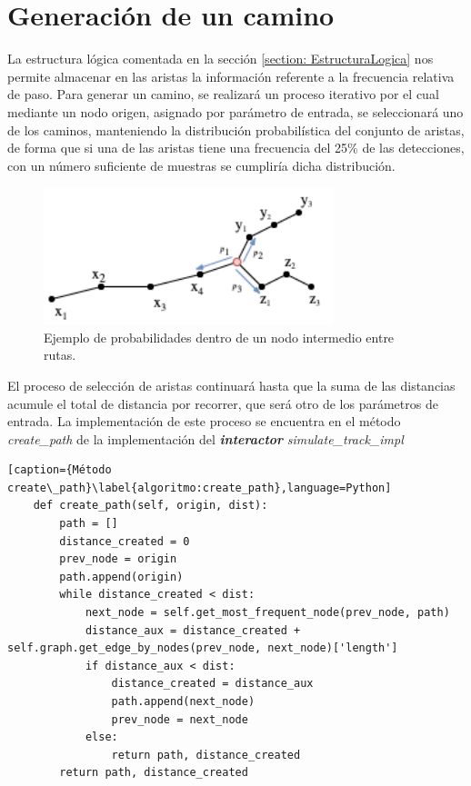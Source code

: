 \section{Generación de un camino}

La estructura lógica comentada en la sección \ref{section: EstructuraLogica} nos permite 
almacenar en las aristas la información referente a la frecuencia relativa de paso.
Para generar un camino, se realizará un proceso iterativo por el cual mediante un nodo origen, 
asignado por parámetro de entrada, se seleccionará uno de los caminos, manteniendo la 
distribución probabilística del conjunto de aristas, de forma que si una de las aristas tiene una 
frecuencia del 25\% de las detecciones, con un número suficiente de muestras se cumpliría dicha 
distribución. 
\begin{figure}[!htb]
\begin{center}
\includegraphics[width=0.75\textwidth]{./Imagenes/SimulationProbabilities.png}
\caption{Ejemplo de probabilidades dentro de un nodo intermedio entre rutas.}
\label{fig:PointGeneration02}
\end{center}
\end{figure}

El proceso de selección de aristas continuará hasta que la suma de las distancias 
acumule el total de distancia por recorrer, que será otro de los parámetros de entrada.
La implementación de este proceso se encuentra en el método \textit{create\_path} de la 
implementación del \textbf{\textit{interactor}} \textit{simulate\_track\_impl}

\begin{lstlisting}[caption={Método create\_path}\label{algoritmo:create_path},language=Python] 
    def create_path(self, origin, dist):
        path = []
        distance_created = 0
        prev_node = origin
        path.append(origin)
        while distance_created < dist:
            next_node = self.get_most_frequent_node(prev_node, path)
            distance_aux = distance_created + self.graph.get_edge_by_nodes(prev_node, next_node)['length']
            if distance_aux < dist:
                distance_created = distance_aux
                path.append(next_node)
                prev_node = next_node
            else:
                return path, distance_created
        return path, distance_created
\end{lstlisting}

